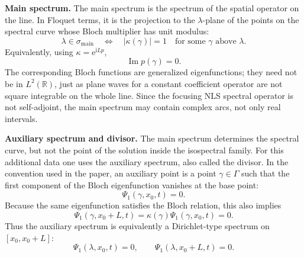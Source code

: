 \documentclass{amsart}
\newcounter{note}
\numberwithin{equation}{hw}
\newcommand{\noteheading}[1]{\vspace{1em}\noindent\textbf{#1}}
\begin{document}
\noteheading{Main spectrum.}
The main spectrum is the spectrum of the spatial operator on the line.
In Floquet terms, it is the projection to the \(\lambda\)-plane of the
points on the spectral curve whose Bloch multiplier has unit modulus:
\begin{equation}
\lambda\in\sigma_{\mathrm{main}}
\quad\Longleftrightarrow\quad
|\kappa(\gamma)|=1
\quad
\text{for some }\gamma\text{ above }\lambda.
\label{eq:note2-main-spectrum}
\end{equation}
Equivalently, using \(\kappa=\mathrm{e}^{\mathrm{i}Lp}\),
\begin{equation}
\operatorname{Im}p(\gamma)=0.
\label{eq:note2-main-spectrum-quasimomentum}
\end{equation}
The corresponding Bloch functions are generalized eigenfunctions; they
need not be in \(L^2(\mathbb{R})\), just as plane waves for a constant
coefficient operator are not square integrable on the whole line.  Since
the focusing NLS spectral operator is not self-adjoint, the main
spectrum may contain complex arcs, not only real intervals.

\noteheading{Auxiliary spectrum and divisor.}
The main spectrum determines the spectral curve, but not the point of
the solution inside the isospectral family.  For this additional data one
uses the auxiliary spectrum, also called the divisor.  In the convention
used in the paper, an auxiliary point is a point
\(\gamma\in\Gamma\) such that the first component of the Bloch
eigenfunction vanishes at the base point:
\begin{equation}
\Psi_1(\gamma,x_0,t)=0.
\label{eq:note2-auxiliary-condition}
\end{equation}
Because the same eigenfunction satisfies the Bloch relation, this also
implies
\begin{equation}
\Psi_1(\gamma,x_0+L,t)
=
\kappa(\gamma)\Psi_1(\gamma,x_0,t)
=
0.
\label{eq:note2-auxiliary-endpoint}
\end{equation}
Thus the auxiliary spectrum is equivalently a Dirichlet-type spectrum on
\([x_0,x_0+L]\):
\begin{equation}
\Psi_1(\lambda,x_0,t)=0,
\qquad
\Psi_1(\lambda,x_0+L,t)=0.
\label{eq:note2-dirichlet-type}
\end{equation}
\end{document}
